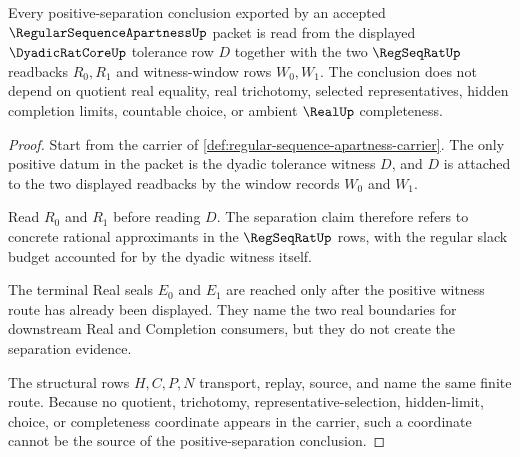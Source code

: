\begin{theorem}
\label{thm:regular-sequence-apartness-positive-separation}
Every positive-separation conclusion exported by an accepted $\RegularSequenceApartnessUp$ packet is read from the displayed $\DyadicRatCoreUp$ tolerance row $D$ together with the two $\RegSeqRatUp$ readbacks $R_0,R_1$ and witness-window rows $W_0,W_1$. The conclusion does not depend on quotient real equality, real trichotomy, selected representatives, hidden completion limits, countable choice, or ambient $\RealUp$ completeness.
\end{theorem}
\begin{proof}
Start from the carrier of \autoref{def:regular-sequence-apartness-carrier}. The only positive datum in the packet is the dyadic tolerance witness $D$, and $D$ is attached to the two displayed readbacks by the window records $W_0$ and $W_1$.

Read $R_0$ and $R_1$ before reading $D$. The separation claim therefore refers to concrete rational approximants in the $\RegSeqRatUp$ rows, with the regular slack budget accounted for by the dyadic witness itself.

The terminal Real seals $E_0$ and $E_1$ are reached only after the positive witness route has already been displayed. They name the two real boundaries for downstream Real and Completion consumers, but they do not create the separation evidence.

The structural rows $H,C,P,N$ transport, replay, source, and name the same finite route. Because no quotient, trichotomy, representative-selection, hidden-limit, choice, or completeness coordinate appears in the carrier, such a coordinate cannot be the source of the positive-separation conclusion.
\end{proof}


